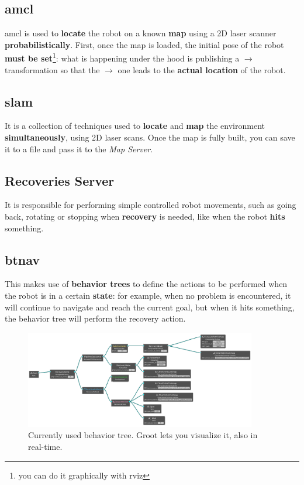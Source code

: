 \subsection{\acrfull{amcl}}

\acrshort{amcl} is used to \textbf{locate} the robot on a known \textbf{map} using a 2D laser scanner \textbf{probabilistically}. First, once the map is loaded, the initial pose of the robot \textbf{must be set}\footnote{you can do it graphically with \acrshort{rviz}}: what is happening under the hood is publishing a  $\rightarrow$  transformation so that the  $\rightarrow$  one leads to the \textbf{actual location} of the robot.

\subsection{\acrfull{slam}}

It is a collection of techniques used to \textbf{locate} and \textbf{map} the environment \textbf{simultaneously}, using 2D laser scans\cite{slam}. Once the map is fully built, you can save it to a file and pass it to the \textit{Map Server}.

\subsection{Recoveries Server}

It is responsible for performing simple controlled robot movements, such as going back, rotating or stopping when \textbf{recovery} is needed, like when the robot \textbf{hits} something.

\subsection{\acrfull{btnav}}

This makes use of \textbf{behavior trees} to define the actions to be performed when the robot is in a certain \textbf{state}: for example, when no problem is encountered, it will continue to navigate and reach the current goal, but when it hits something, the behavior tree will perform the recovery action.

\begin{figure}[h]
    \centering
    \includegraphics[width=0.9\textwidth]{images/bt-alpha.png}
    \caption{Currently used behavior tree. Groot lets you visualize it, also in real-time.\cite{groot}}
\end{figure}

